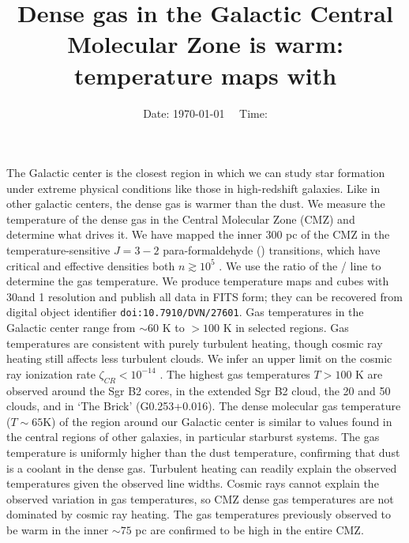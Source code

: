 



\title{Dense gas in the Galactic Central Molecular Zone is warm: temperature maps with \formaldehyde}


\date{Date: \today ~~ Time: \currenttime}

\abstract
{The Galactic center is the closest region in which we can study star formation
under extreme physical conditions like those in high-redshift galaxies.  Like
in other galactic centers, the dense gas is warmer than the dust.}
{We measure the temperature of the dense gas in the Central Molecular Zone
(CMZ) and determine what drives it.}
{We have mapped the inner 300 pc of the CMZ in the temperature-sensitive
$J=3-2$ para-formaldehyde (\para) transitions, which have critical and effective
densities both $n\gtrsim10^5$ \percc.  We use the ratio of the \threeohthree /
\threetwoone line to determine the gas temperature.
We produce temperature maps and cubes with 30\arcsec and 1 \kms resolution and
publish all data in FITS form; they can be recovered from digital object
identifier \texttt{doi:10.7910/DVN/27601}.}
{Gas temperatures in the Galactic center range from $\sim60$ K to $>100$ K in
selected regions.  Gas temperatures are consistent with purely turbulent
heating, though cosmic ray heating still affects less turbulent clouds.  We
infer an upper
limit on the cosmic ray ionization rate $\zeta_{CR}<10^{-14}$ \pers. 
The highest gas temperatures $T>100$ K are observed around the Sgr B2 cores, in
the extended Sgr B2 cloud, the 20 \kms and 50 \kms clouds, and in `The Brick'
(G0.253+0.016).
}
{
The dense molecular gas temperature ($T\sim 65$K) of the region around our
Galactic center is similar to values found in the central regions of other
galaxies, in particular starburst systems.  The gas temperature is uniformly
higher than the dust temperature, confirming that dust is a coolant in the
dense gas.  Turbulent heating can readily explain the observed temperatures
given the observed line widths.  Cosmic rays cannot explain the observed
variation in gas temperatures, so CMZ dense gas temperatures are not dominated
by cosmic ray heating.  The gas temperatures previously observed to be warm
in the inner $\sim75$ pc are confirmed to be high in the entire CMZ.}




